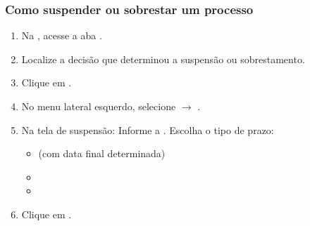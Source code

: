 \documentclass[letterpaper,10pt,brazil]{sphinxmanual}
\begin{document}
\subsubsection{Como suspender ou sobrestar um processo}
\label{\detokenize{projud_39_suspensaosobrestamento:como-suspender-ou-sobrestar-um-processo}}\begin{enumerate}
%
\item {} 
\sphinxAtStartPar
Na , acesse a aba .

\item {} 
\sphinxAtStartPar
Localize a decisão que determinou a suspensão ou sobrestamento.

\item {} 
\sphinxAtStartPar
Clique em .

\item {} 
\sphinxAtStartPar
No menu lateral esquerdo, selecione  \(\rightarrow\) .

\begin{sphinxVerbatim}[commandchars=\\\{\}]
\PYG{p}{[}  \PYG{p}{]}
  
       
\end{sphinxVerbatim}

\item {} 
\sphinxAtStartPar
Na tela de suspensão:
\sphinxhyphen{} Informe a .
\sphinxhyphen{} Escolha o tipo de prazo:
\begin{itemize}
\item {} 
\sphinxAtStartPar
{} (com data final determinada)

\item {} 
\sphinxAtStartPar
{}

\item {} 
\sphinxAtStartPar
{}

\end{itemize}

\item {} 
\sphinxAtStartPar
Clique em .

\end{enumerate}
\end{document}
